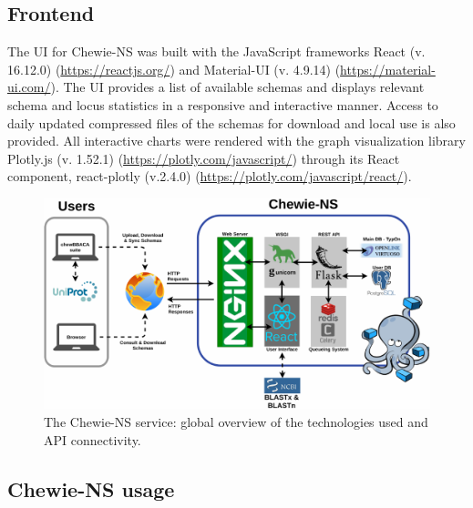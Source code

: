 \subsection{Frontend} \label{ssec:ch3_database_creation_frontend}

The \ac{UI} for \ac{Chewie-NS} was built with the JavaScript frameworks React (v. 16.12.0) (\url{https://reactjs.org/}) and Material-UI (v. 4.9.14) (\url{https://material-ui.com/}). The \ac{UI} provides a list of available schemas and displays relevant schema and locus statistics in a responsive and interactive manner. Access to daily updated compressed files of the schemas for download and local use is also provided. All interactive charts were rendered with the graph visualization library Plotly.js (v. 1.52.1) (\url{https://plotly.com/javascript/}) through its React component, react-plotly (v.2.4.0) (\url{https://plotly.com/javascript/react/}).

\newpage
\begin{landscape}
\vspace*{\fill}
\begin{figure}[!ht]
    \centering
    \includegraphics[width=20cm]{figures/chapter 3/Figure1.pdf}
    \caption[The Chewie-NS service: global overview of the technologies used and API connectivity.]{The Chewie-NS service: global overview of the technologies used and API connectivity.}
    \label{fig:chap3_figure1}
\end{figure}
\vspace*{\fill}
\end{landscape}

\subsection{Chewie-NS usage} \label{ssec:ch3_database_creation_usage}

